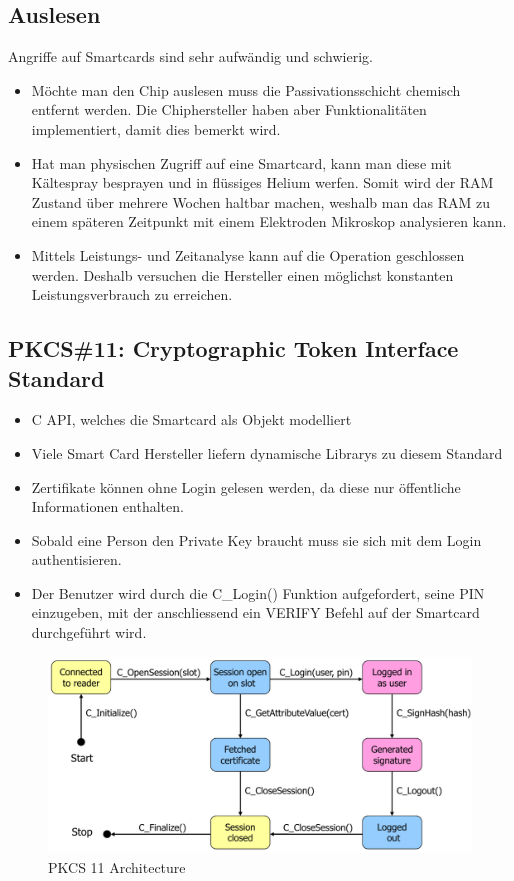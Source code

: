 \subsection{Auslesen}
Angriffe auf Smartcards sind sehr aufwändig und schwierig.
\begin{itemize}
	\item Möchte man den Chip auslesen muss die Passivationsschicht chemisch entfernt werden. Die Chiphersteller haben aber Funktionalitäten implementiert, damit dies bemerkt wird. 
	\item Hat man physischen Zugriff auf eine Smartcard, kann man diese mit Kältespray besprayen und in flüssiges Helium werfen. Somit wird der RAM Zustand über mehrere Wochen haltbar machen, weshalb man das RAM zu einem späteren Zeitpunkt mit einem Elektroden Mikroskop analysieren kann.
	\item Mittels Leistungs- und Zeitanalyse kann auf die Operation geschlossen werden. Deshalb versuchen die Hersteller einen möglichst konstanten Leistungsverbrauch zu erreichen.
\end{itemize}

\subsection{PKCS\#11: Cryptographic Token Interface Standard}
\begin{itemize}
    \item C API, welches die Smartcard als Objekt modelliert
    \item Viele Smart Card Hersteller liefern dynamische Librarys zu diesem Standard
    \item Zertifikate können ohne Login gelesen werden, da diese nur öffentliche Informationen enthalten. 
    \item Sobald eine Person den Private Key braucht muss sie sich mit dem Login authentisieren.
    \item Der Benutzer wird durch die C\_Login() Funktion aufgefordert, seine PIN einzugeben, mit der anschliessend ein VERIFY Befehl auf der Smartcard durchgeführt wird.
\end{itemize}
\begin{figure}[h!]
	\centering
	\includegraphics[width=0.7\linewidth]{images/pkcs11_architecture.png}
	\caption{PKCS 11 Architecture}  
	\label{fig:pkcs11architecture}
\end{figure}

